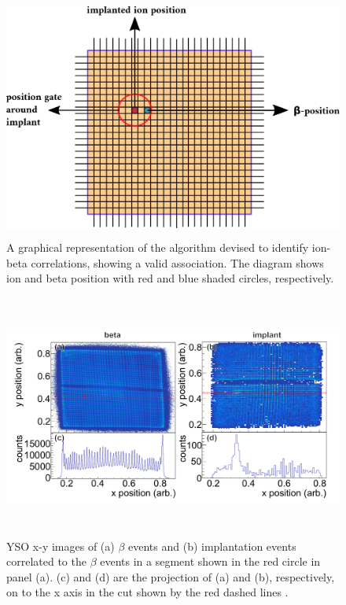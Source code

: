 \begin{figure}[h!]
    \centering
    \includegraphics[width=12cm,height=8cm]{figures/pastedImage.png}
    \caption[A graphical representation of the algorithm devised to identify ion-beta]{A graphical representation of the algorithm devised to identify ion-beta correlations, showing a valid association. The diagram shows ion and beta position with red and blue shaded circles, respectively.}
    \label{fig:ion_beta_correlations}
\end{figure}

\begin{figure}[h!]
    \centering
    \includegraphics[width=17cm,height=8cm]{figures/ion_beta_correlations.png}
    \caption[YSO x-y images of (a) $\beta$ events and (b) implantation events correlated]{YSO x-y images of (a) $\beta$ events and (b) implantation events correlated to the $\beta$ events in a segment shown in the red circle in panel (a). (c) and (d) are the projection of (a) and (b), respectively, on to the x axis in the cut shown by the red dashed lines \citep{yso2018}.}
\label{fig:ysocorrelations}
\end{figure}

